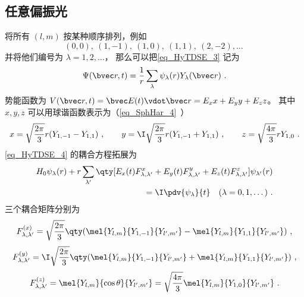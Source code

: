 \subsection{任意偏振光}
将所有 $(l,m)$ 按某种顺序排列，例如
\begin{equation}
(0, 0),\ (1,-1),\ (1,0),\ (1,1),\ (2,-2), \dots~
\end{equation}
并将他们编号为 $\lambda = 1,2, \dots$， 那么可以把\autoref{eq_HyTDSE_3} 记为
\begin{equation}
\Psi(\bvec r, t) = \frac{1}{r}\sum_\lambda \psi_\lambda(r) Y_\lambda(\bvec r)~.
\end{equation}
势能函数为 $V(\bvec r, t) = \bvec E(t) \vdot \bvec r  = E_x x + E_y y + E_z z$。 其中 $x,y,z$ 可以用球谐函数表示为（\autoref{eq_SphHar_4}~）
\begin{equation}
x = \sqrt{\frac{2\pi}{3}} r (Y_{1,-1} - Y_{1,1})~, \qquad
y = \I \sqrt{\frac{2\pi}{3}} r (Y_{1,-1}+Y_{1,1})~, \qquad
z = \sqrt{\frac{4\pi}{3}} rY_{1,0}~.
\end{equation}
\autoref{eq_HyTDSE_4} 的耦合方程拓展为
\begin{equation}
\begin{aligned}
H_0 \psi_{\lambda}(r) + r \sum_{\lambda'} \qty[E_x(t) F_{\lambda, \lambda'}^{x} + E_y(t) F_{\lambda, \lambda'}^{y} + E_z(t) F_{\lambda, \lambda'}^{z}] \psi_{\lambda'}(r) \\
= \I \pdv{\psi_{\lambda}}{t} \quad (\lambda=0,1,\dots)~.
\end{aligned}
\end{equation}
三个耦合矩阵分别为
\begin{equation}
\begin{aligned}
F_{\lambda,\lambda'}^{(x)} = \sqrt{\frac{2\pi}{3}} \qty(\mel{Y_{l,m}}{Y_{1,-1}}{Y_{l',m'}} - \mel{Y_{l,m}}{Y_{1,1}}{Y_{l',m'}})~,
\end{aligned}
\end{equation}
\begin{equation}
\begin{aligned}
F_{\lambda,\lambda'}^{(y)} = \I\sqrt{\frac{2\pi}{3}} \qty(\mel{Y_{l,m}}{Y_{1,-1}}{Y_{l',m'}} + \mel{Y_{l,m}}{Y_{1,1}}{Y_{l',m'}})~,
\end{aligned}
\end{equation}
\begin{equation}\label{eq_HyTDSE_10}
\begin{aligned}
F_{\lambda,\lambda'}^{(z)} = \mel{Y_{l,m}}{\cos\theta}{Y_{l',m'}}
= \sqrt{\frac{4\pi}{3}} \mel{Y_{l,m}}{Y_{1,0}}{Y_{l',m'}}~.
\end{aligned}
\end{equation}
